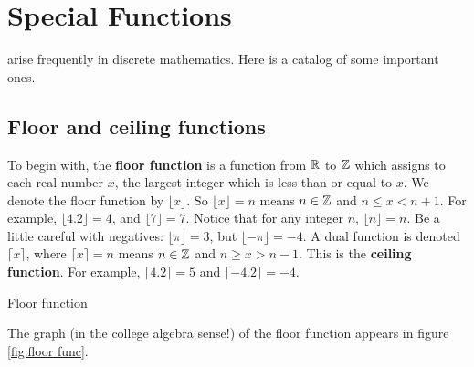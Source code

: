 \chapter{Special Functions}

 arise frequently in discrete mathematics. 
Here is a catalog of some important ones.

\section{Floor and ceiling functions}
To begin with, the {\bfseries floor function} is a function from $\mathbb{R}$ to $\mathbb{Z}$ 
which assigns
to each real number $x$, the largest integer which is less than or equal to $x$.
We denote the floor function by $\lfloor x\rfloor$. So $\lfloor x\rfloor = n$
 means
$n\in \mathbb{Z}$ and  $n\leq x< n+1$. For example, $\lfloor 4.2 \rfloor = 4$, and
$\lfloor 7 \rfloor = 7$. Notice that for any integer $n$, $\lfloor n \rfloor = n$.
Be a little careful with negatives: $\lfloor \pi \rfloor = 3$, but 
 $\lfloor -\pi \rfloor = -4$.
A dual function is denoted $\lceil x\rceil$,
where $\lceil x\rceil = n$ means $n\in \mathbb{Z}$ and $n\geq x>n-1$. This is the
{\bfseries ceiling function}. For example, $\lceil 4.2 \rceil = 5$ and 
$\lceil -4.2 \rceil = -4$.
\begin{marginfigure}
\caption{Floor function}\label{fig:floor func}
\end{marginfigure}
The graph (in the college algebra sense!) of the floor function appears in
figure \ref{fig:floor func}.

